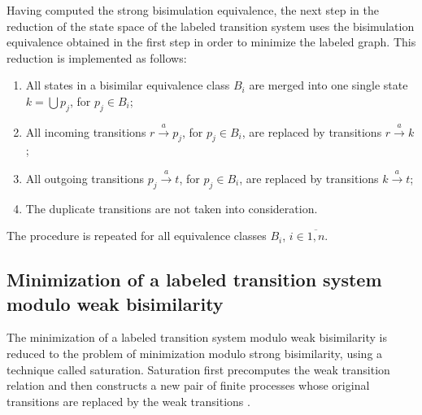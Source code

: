 Having computed the strong bisimulation equivalence, the next step in the reduction of the state space of the labeled transition system uses the bisimulation equivalence obtained in the first step in order to minimize the labeled graph. This reduction is implemented as follows:
\begin{enumerate}
	\item All states in a bisimilar equivalence class $B_{i}$ are merged into one single state $k=\bigcup p_{j}$, for $p_{j}\in B_{i}$;
	\item All incoming transitions $r \stackrel{a}{\rightarrow} p_{j}$, for $p_{j}\in B_{i}$, are replaced by transitions $r \stackrel{a}{\rightarrow} k$;
	\item All outgoing transitions $p_{j} \stackrel{a}{\rightarrow} t$, for $p_{j}\in B_{i}$, are replaced by transitions $k \stackrel{a}{\rightarrow} t$;
	\item The duplicate transitions are not taken into consideration.
\end{enumerate}
The procedure is repeated for all equivalence classes $B_{i}$, $i\in \overline{1,n}$.

\subsection{Minimization of a labeled transition system modulo weak bisimilarity}
The minimization of a labeled transition system modulo weak bisimilarity is reduced to the problem of minimization modulo strong bisimilarity, using a technique called saturation. Saturation first precomputes the weak transition relation and then constructs a new pair of finite processes whose original transitions are replaced by the weak transitions \cite{ReactiveSystems}. 

